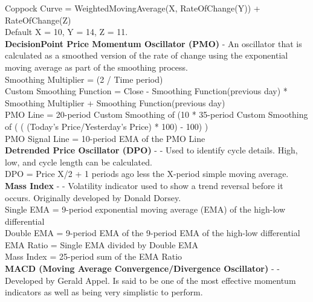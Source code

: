 \documentclass[conference]{IEEEtran}
\begin{document}
\noindent
Coppock Curve = WeightedMovingAverage(X, RateOfChange(Y)) + RateOfChange(Z)\\
Default X = 10, Y = 14, Z = 11. \\

\iffalse
[]
\fi

\noindent
\textbf{DecisionPoint Price Momentum Oscillator (PMO)} - An oscillator that is calculated as a smoothed version of the rate of change using the exponential moving average as part of the smoothing process. \\

\noindent
Smoothing Multiplier = (2 / Time period)\\
Custom Smoothing Function = {Close - Smoothing Function(previous day)} * Smoothing Multiplier + Smoothing Function(previous day) \\
PMO Line = 20-period Custom Smoothing of (10 * 35-period Custom Smoothing of ( ( (Today's Price/Yesterday's Price) * 100) - 100) )\\
PMO Signal Line = 10-period EMA of the PMO Line\\

\iffalse
[]
\fi

\noindent
\textbf{Detrended Price Oscillator (DPO)} - \cite{Murphy1999} - Used to identify cycle details. High, low, and cycle length can be calculated.\\

\noindent
DPO = Price {X/2 + 1} periods ago less the X-period simple moving average.\\

\iffalse
[]
\fi

\noindent
\textbf{Mass Index} - \cite{Murphy1999} - Volatility indicator used to show a trend reversal before it occurs.  Originally developed by Donald Dorsey. \\

\noindent
Single EMA = 9-period exponential moving average (EMA) of the high-low differential \\
Double EMA = 9-period EMA of the 9-period EMA of the high-low differential \\
EMA Ratio = Single EMA divided by Double EMA \\
Mass Index = 25-period sum of the EMA Ratio \\

\iffalse
[]
\fi

\noindent
\textbf{MACD (Moving Average Convergence/Divergence Oscillator)} - \cite{Appel2005} - Developed by Gerald Appel. Is said to be one of the most effective momentum indicators as well as being very simplistic to perform. \\
\end{document}
